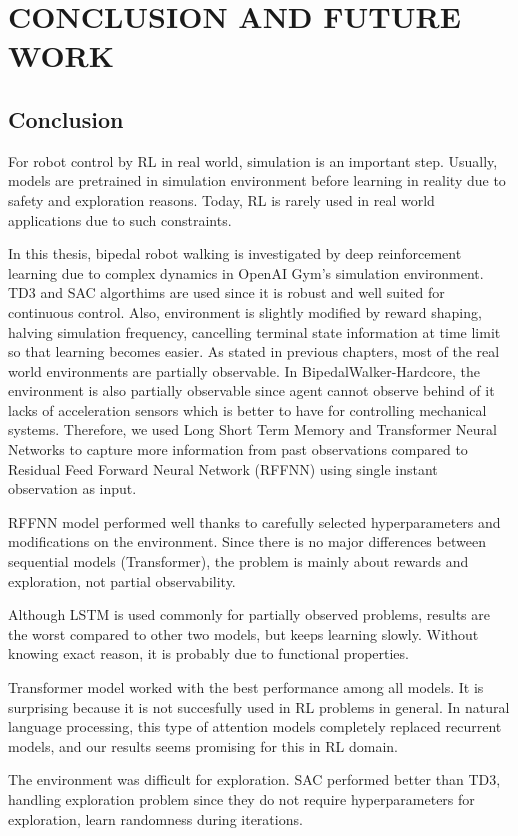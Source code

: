 \chapter{CONCLUSION AND FUTURE WORK}
\label{chap:conclusion_future_work}

\section{Conclusion}
\label{sec:conclusion}
For robot control by RL in real world, simulation is an important step. 
Usually, models are pretrained in simulation environment before learning in reality due to safety and exploration reasons. 
Today, RL is rarely used in real world applications due to such constraints. 

In this thesis, bipedal robot walking is investigated by deep  reinforcement learning due to complex dynamics in OpenAI Gym's simulation environment. 
TD3 and SAC algorthims are used since it is robust and well suited for continuous control. 
Also, environment is slightly modified by reward shaping, halving simulation frequency, cancelling terminal state information at time limit so that learning becomes easier.  
As stated in previous chapters, most of the real world environments are partially observable. 
In BipedalWalker-Hardcore, the environment is also partially observable since agent cannot observe behind of it lacks of acceleration sensors which is better to have for controlling mechanical systems. 
Therefore, we used Long Short Term Memory and Transformer Neural Networks to capture more information from past observations compared to Residual Feed Forward Neural Network (RFFNN) using single instant observation as input. 

RFFNN model performed well thanks to carefully selected hyperparameters and modifications on the environment. 
Since there is no major differences between sequential models (Transformer), the problem is mainly about rewards and exploration, not partial observability. 

Although LSTM is used commonly for partially observed problems, results are the worst compared to other two models, but keeps learning slowly. 
Without knowing exact reason, it is probably due to functional properties. 

Transformer model worked with the best performance among all models. 
It is surprising because it is not succesfully used in RL problems in general. 
In natural language processing, this type of attention models completely replaced recurrent models, and our results seems promising for this in RL domain. 

The environment was difficult for exploration. SAC performed better than TD3, handling exploration problem since they do not require hyperparameters for exploration, learn randomness during iterations. 
